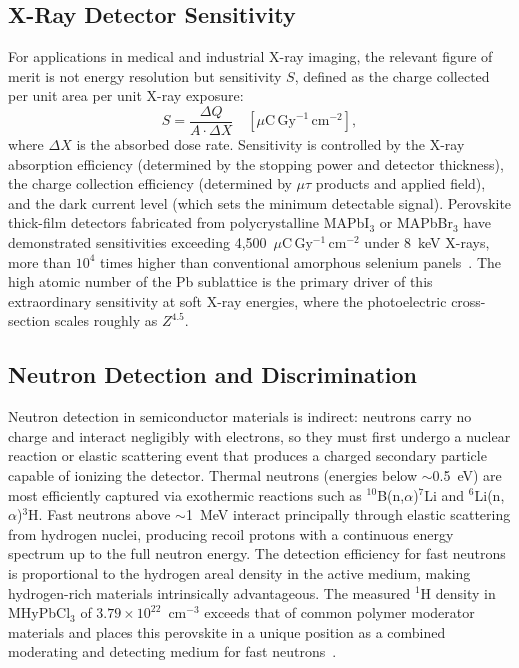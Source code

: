 \subsection{X-Ray Detector Sensitivity}

For applications in medical and industrial X-ray imaging, the relevant
figure of merit is not energy resolution but sensitivity $S$, defined as
the charge collected per unit area per unit X-ray exposure:
\begin{equation}
  S = \frac{\Delta Q}{A \cdot \Delta X} \quad \left[\mu\text{C}\,\text{Gy}^{-1}\,\text{cm}^{-2}\right],
  \label{eq:sensitivity}
\end{equation}
where $\Delta X$ is the absorbed dose rate.  Sensitivity is controlled by
the X-ray absorption efficiency (determined by the stopping power and
detector thickness), the charge collection efficiency (determined by $\mu\tau$
products and applied field), and the dark current level (which sets the
minimum detectable signal).  Perovskite thick-film detectors fabricated
from polycrystalline MAPbI$_3$ or MAPbBr$_3$ have demonstrated sensitivities
exceeding 4,500~$\mu$C\,Gy$^{-1}$\,cm$^{-2}$ under 8~keV X-rays,
more than $10^4$ times higher than conventional amorphous selenium
panels~\cite{Wei2017}.  The high atomic number of the Pb sublattice is
the primary driver of this extraordinary sensitivity at soft X-ray
energies, where the photoelectric cross-section scales roughly as $Z^{4.5}$.

\subsection{Neutron Detection and Discrimination}

Neutron detection in semiconductor materials is indirect: neutrons carry
no charge and interact negligibly with electrons, so they must first
undergo a nuclear reaction or elastic scattering event that produces a
charged secondary particle capable of ionizing the detector.  Thermal
neutrons (energies below $\sim$0.5~eV) are most efficiently captured via
exothermic reactions such as $^{10}$B(n,$\alpha$)$^7$Li and
$^6$Li(n,$\alpha$)$^3$H.  Fast neutrons above $\sim$1~MeV interact
principally through elastic scattering from hydrogen nuclei, producing
recoil protons with a continuous energy spectrum up to the full neutron
energy.  The detection efficiency for fast neutrons is proportional to
the hydrogen areal density in the active medium, making hydrogen-rich
materials intrinsically advantageous.  The measured $^{1}$H density in
MHyPbCl$_3$ of $3.79 \times 10^{22}$~cm$^{-3}$ exceeds that of common
polymer moderator materials and places this perovskite in a unique
position as a combined moderating and detecting medium for fast
neutrons~\cite{Panaccione_NIM_2024}.

